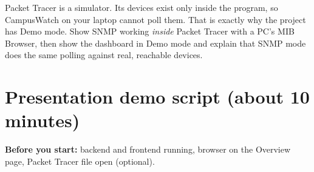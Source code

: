 \documentclass[11pt,a4paper]{article}
\begin{document}
\begin{careful}
Packet Tracer is a simulator. Its devices exist only inside the program, so CampusWatch on your laptop cannot poll them.
That is exactly why the project has Demo mode. Show SNMP working \emph{inside} Packet Tracer with a PC's MIB Browser, then show the
dashboard in Demo mode and explain that SNMP mode does the same polling against real, reachable devices.
\end{careful}

\section{Presentation demo script (about 10 minutes)}

\textbf{Before you start:} backend and frontend running, browser on the Overview page, Packet Tracer file open (optional).
\end{document}
